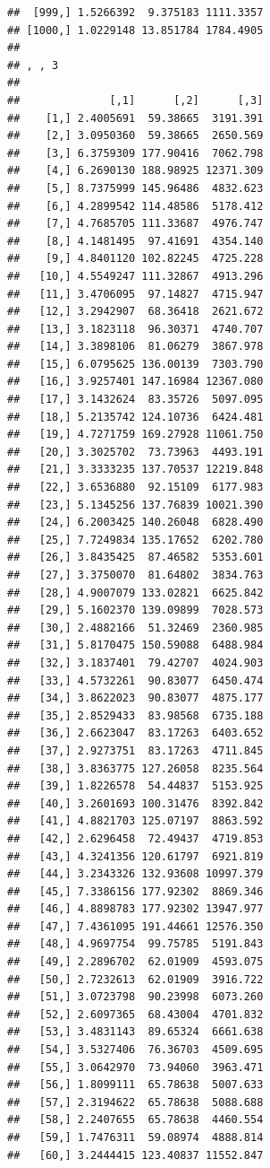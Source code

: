 \documentclass[article]{jss}\usepackage[]{graphicx}\usepackage[]{xcolor}
\makeatletter
\newenvironment{kframe}{%
 \def\at@end@of@kframe{}%
 \ifinner\ifhmode%
  \def\at@end@of@kframe{\end{minipage}}%
  \begin{minipage}{\columnwidth}%
 \fi\fi%
 \def\FrameCommand##1{\hskip\@totalleftmargin \hskip-\fboxsep
 \colorbox{shadecolor}{##1}\hskip-\fboxsep
     \hskip-\linewidth \hskip-\@totalleftmargin \hskip\columnwidth}%
 \MakeFramed {\advance\hsize-\width
   \@totalleftmargin\z@ \linewidth\hsize
   \@setminipage}}%
 {\par\unskip\endMakeFramed%
 \at@end@of@kframe}
\newenvironment{knitrout}{}{} %
\makeatother
\begin{document}
\begin{knitrout}
\begin{kframe}
\begin{verbatim}
##  [999,] 1.5266392  9.375183 1111.3357
## [1000,] 1.0229148 13.851784 1784.4905
## 
## , , 3
## 
##              [,1]      [,2]      [,3]
##    [1,] 2.4005691  59.38665  3191.391
##    [2,] 3.0950360  59.38665  2650.569
##    [3,] 6.3759309 177.90416  7062.798
##    [4,] 6.2690130 188.98925 12371.309
##    [5,] 8.7375999 145.96486  4832.623
##    [6,] 4.2899542 114.48586  5178.412
##    [7,] 4.7685705 111.33687  4976.747
##    [8,] 4.1481495  97.41691  4354.140
##    [9,] 4.8401120 102.82245  4725.228
##   [10,] 4.5549247 111.32867  4913.296
##   [11,] 3.4706095  97.14827  4715.947
##   [12,] 3.2942907  68.36418  2621.672
##   [13,] 3.1823118  96.30371  4740.707
##   [14,] 3.3898106  81.06279  3867.978
##   [15,] 6.0795625 136.00139  7303.790
##   [16,] 3.9257401 147.16984 12367.080
##   [17,] 3.1432624  83.35726  5097.095
##   [18,] 5.2135742 124.10736  6424.481
##   [19,] 4.7271759 169.27928 11061.750
##   [20,] 3.3025702  73.73963  4493.191
##   [21,] 3.3333235 137.70537 12219.848
##   [22,] 3.6536880  92.15109  6177.983
##   [23,] 5.1345256 137.76839 10021.390
##   [24,] 6.2003425 140.26048  6828.490
##   [25,] 7.7249834 135.17652  6202.780
##   [26,] 3.8435425  87.46582  5353.601
##   [27,] 3.3750070  81.64802  3834.763
##   [28,] 4.9007079 133.02821  6625.842
##   [29,] 5.1602370 139.09899  7028.573
##   [30,] 2.4882166  51.32469  2360.985
##   [31,] 5.8170475 150.59088  6488.984
##   [32,] 3.1837401  79.42707  4024.903
##   [33,] 4.5732261  90.83077  6450.474
##   [34,] 3.8622023  90.83077  4875.177
##   [35,] 2.8529433  83.98568  6735.188
##   [36,] 2.6623047  83.17263  6403.652
##   [37,] 2.9273751  83.17263  4711.845
##   [38,] 3.8363775 127.26058  8235.564
##   [39,] 1.8226578  54.44837  5153.925
##   [40,] 3.2601693 100.31476  8392.842
##   [41,] 4.8821703 125.07197  8863.592
##   [42,] 2.6296458  72.49437  4719.853
##   [43,] 4.3241356 120.61797  6921.819
##   [44,] 3.2343326 132.93608 10997.379
##   [45,] 7.3386156 177.92302  8869.346
##   [46,] 4.8898783 177.92302 13947.977
##   [47,] 7.4361095 191.44661 12576.350
##   [48,] 4.9697754  99.75785  5191.843
##   [49,] 2.2896702  62.01909  4593.075
##   [50,] 2.7232613  62.01909  3916.722
##   [51,] 3.0723798  90.23998  6073.260
##   [52,] 2.6097365  68.43004  4701.832
##   [53,] 3.4831143  89.65324  6661.638
##   [54,] 3.5327406  76.36703  4509.695
##   [55,] 3.0642970  73.94060  3963.471
##   [56,] 1.8099111  65.78638  5007.633
##   [57,] 2.3194622  65.78638  5088.688
##   [58,] 2.2407655  65.78638  4460.554
##   [59,] 1.7476311  59.08974  4888.814
##   [60,] 3.2444415 123.40837 11552.847

\end{verbatim}
\end{kframe}
\end{knitrout}
\end{document}
